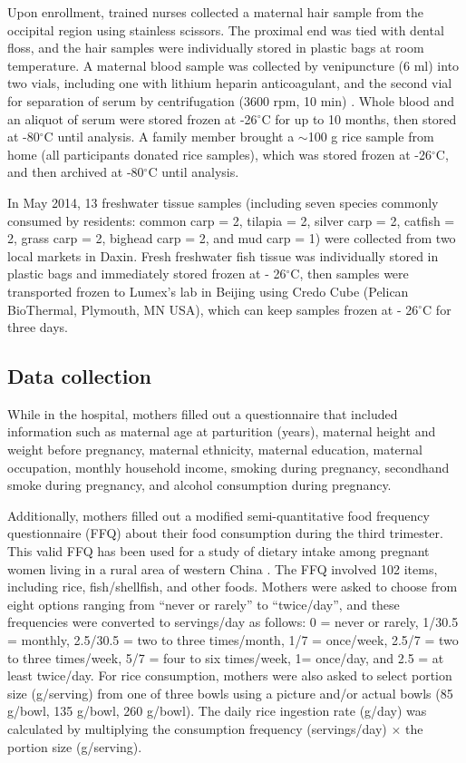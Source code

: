 Upon enrollment, trained nurses collected a maternal hair sample from the occipital region using stainless scissors. The proximal end was tied with dental floss, and the hair samples were individually stored in plastic bags at room temperature. A maternal blood sample was collected by venipuncture (6 ml) into two vials, including one with lithium heparin anticoagulant, and the second vial for separation of serum by centrifugation (3600 rpm, 10 min) \citep{yu2011prenatal}. Whole blood and an aliquot of serum were stored frozen at -26\({^\circ}\)C for up to 10 months, then stored at -80\({^\circ}\)C until analysis. A family member brought a \({\sim}\)100 g rice sample from home (all participants donated rice samples), which was stored frozen at -26\({^\circ}\)C, and then archived at -80\({^\circ}\)C until analysis. 

In May 2014, 13 freshwater tissue samples (including seven species commonly consumed by residents: common carp = 2, tilapia = 2, silver carp = 2, catfish = 2, grass carp = 2, bighead carp = 2, and mud carp = 1) were collected from two local markets in Daxin. Fresh freshwater fish tissue was individually stored in plastic bags and immediately stored frozen at - 26\({^\circ}\)C, then samples were transported frozen to Lumex's lab in Beijing using Credo Cube (Pelican BioThermal, Plymouth, MN USA), which can keep samples frozen at - 26\({^\circ}\)C for three days.

\subsection{Data collection}

While in the hospital, mothers filled out a questionnaire that included information such as maternal age at parturition (years), maternal height and weight before pregnancy, maternal ethnicity, maternal education, maternal occupation, monthly household income, smoking during pregnancy, secondhand smoke during pregnancy, and alcohol consumption during pregnancy. 

Additionally, mothers filled out a modified semi-quantitative food frequency questionnaire (FFQ) about their food consumption during the third trimester. This valid FFQ has been used for a study of dietary intake among pregnant women living in a rural area of western China \citep{cheng2009assessment}. The FFQ involved 102 items, including rice, fish/shellfish, and other foods. Mothers were asked to choose from eight options ranging from ``never or rarely'' to ``twice/day'', and these frequencies were converted to servings/day as follows: 0 = never or rarely, 1/30.5 = monthly, 2.5/30.5 = two to three times/month, 1/7 = once/week, 2.5/7 = two to three times/week, 5/7 = four to six times/week, 1= once/day, and 2.5 = at least twice/day. For rice consumption, mothers were also asked to select portion size (g/serving) from one of three bowls using a picture and/or actual bowls (85 g/bowl, 135 g/bowl, 260 g/bowl). The daily rice ingestion rate (g/day) was calculated by multiplying the consumption frequency (servings/day) \({\times}\) the portion size (g/serving). 

